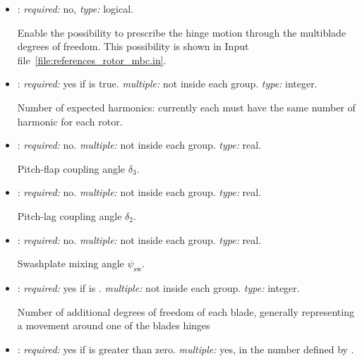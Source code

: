 \begin{itemize}
    offset from the rotation pole (the origin of the multiple reference frame) of the beginning of the chain of reference frames for each blade. It is constant and does not imply any secondary motion, can be used to represent the central part of the rotor axis assembly. 

    \item {}: \textit{required:} no, \textit{type:} logical. 
    
    Enable the possibility to prescribe the hinge motion through the multiblade degrees of freedom. 
    This possibility is shown in Input file~\ref{file:references_rotor_mbc.in}. 
    
    \item {}: \textit{required:} yes if  is true. 
    \textit{multiple:} not inside each  group. \textit{type:} integer.

    Number of expected harmonics: currently each  must have the same number of harmonic for each rotor. 
    
    \item {}: \textit{required:} no. 
    \textit{multiple:} not inside each  group. \textit{type:} real. 

    Pitch-flap coupling angle $\delta_3$. 

    \item {}: \textit{required:} no. 
    \textit{multiple:} not inside each  group. \textit{type:} real. 

    Pitch-lag coupling angle $\delta_2$. 

    \item {}: \textit{required:} no. 
    \textit{multiple:} not inside each  group. \textit{type:} real. 

    Swashplate mixing angle $\psi_\mathrm{sw}$. 

    \item {}: \textit{required:} yes if  is . 
    \textit{multiple:} not inside each  group. \textit{type:} integer.
    
    Number of additional degrees of freedom of each blade, generally representing 
    a movement around one of the blades hinges
    
    \item {}: \textit{required:} yes if  is greater than zero. 
    \textit{multiple:} yes, in the number defined by . 
    

\end{itemize}
